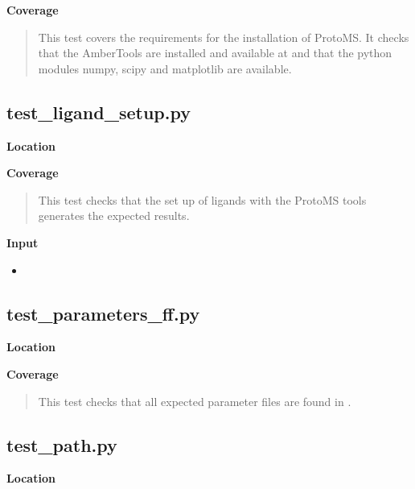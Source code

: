\documentclass[letterpaper,10pt,english]{sphinxmanual}
\begin{document}
\textbf{Coverage}
\begin{quote}

This test covers the requirements for the installation of ProtoMS.  It checks that the AmberTools are installed and available at  and that the python modules numpy, scipy and matplotlib are available.
\end{quote}


\subsection{test\_ligand\_setup.py}
\label{testsuite:test-ligand-setup-py}
\textbf{Location}
\begin{quote}

\end{quote}

\textbf{Coverage}
\begin{quote}

This test checks that the set up of ligands with the ProtoMS tools generates the expected results.
\end{quote}

\textbf{Input}
\begin{itemize}
\item {} 

\end{itemize}


\subsection{test\_parameters\_ff.py}
\label{testsuite:test-parameters-ff-py}
\textbf{Location}
\begin{quote}

\end{quote}

\textbf{Coverage}
\begin{quote}

This test checks that all expected parameter files are found in .
\end{quote}


\subsection{test\_path.py}
\label{testsuite:test-path-py}
\textbf{Location}
\begin{quote}

\end{quote}
\end{document}
